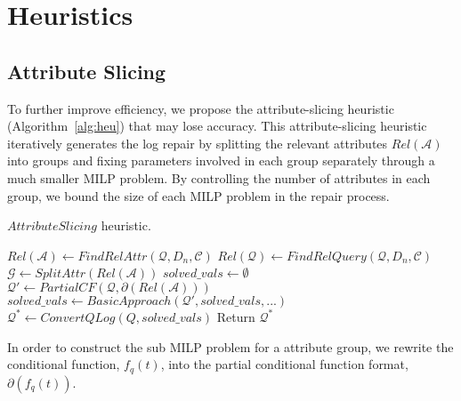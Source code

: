 \section{Heuristics}
\label{sec:heurstic}

\subsection{Attribute Slicing}

To further improve efficiency, we propose the attribute-slicing heuristic 
(Algorithm~\ref{alg:heu}) that may lose accuracy. This attribute-slicing
heuristic iteratively
generates the log repair by splitting the relevant 
attributes $Rel\mathcal{(A)}$ into
groups and fixing parameters involved 
in each group separately through a 
much smaller MILP problem. By 
controlling the number of attributes 
in each group, we bound the size of 
each MILP problem in the repair process.

\begin{algorithm}[htbp]
\caption{$AttributeSlicing$ heuristic.}
\label{alg:heu}
\begin{algorithmic}
\STATE $Rel\mathcal{(A)} \leftarrow FindRelAttr(\mathcal{Q}, D_n, \mathcal{C})$
\STATE $Rel\mathcal{(Q)} \leftarrow FindRelQuery(\mathcal{Q}, D_n, \mathcal{C})$
\STATE $\mathcal{G} \leftarrow SplitAttr(Rel\mathcal{(A)})$
\STATE $solved\_vals \leftarrow \emptyset$
\STATE $\mathcal{Q'} \leftarrow PartialCF(\mathcal{Q}, \partial (Rel\mathcal{(A)}))$
\STATE $solved\_vals \leftarrow BasicApproach(\mathcal{Q'}, solved\_vals, ...)$
\ENDFOR
\STATE $\mathcal{Q}^* \leftarrow ConvertQLog(Q, solved\_vals)$
\STATE Return $\mathcal{Q}^*$
\end{algorithmic}
\end{algorithm}

In order to construct the sub MILP problem 
for a attribute group, we rewrite the conditional 
function, $f_q(t)$, into 
the partial conditional function format, $\partial (f_q(t))$.


